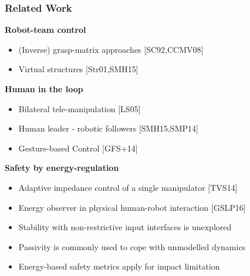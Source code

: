 \documentclass[student]{ITRslides}
\begin{document}
\begin{frame}
	\frametitle{Related Work}
	\textbf{Robot-team control}
	\begin{itemize}
		\item (Inverse) grasp-matrix approaches \nocite{Schneider_92,Caccavale_08} {\tiny [SC92,CCMV08]} 	
		\item Virtual structures \nocite{Stramigioli_01, Sieber_15} {\tiny [Str01,SMH15]} 
	\end{itemize}
	\textbf{Human in the loop}
	\begin{itemize}	
		\item Bilateral tele-manipulation  \nocite{Lee_05} {\tiny [LS05]} 	
		\item Human leader - robotic followers \nocite{Sieber_15, Scheggi_14}{\tiny [SMH15,SMP14]} 
		\item Gesture-based Control \nocite{Gioioso_2014}{\tiny [GFS+14]} 
	\end{itemize}
	\textbf{Safety by energy-regulation}
	\begin{itemize}
		\item Adaptive impedance control of a single manipulator \nocite{Tadele_14}{\tiny [TVS14]}
		\item Energy observer in physical human-robot interaction \nocite{Geravand_16}{\tiny [GSLP16]}
	\end{itemize}
		
			\begin{block}{}
			\begin{itemize}
			\item Stability with non-restrictive input interfaces is unexplored
			\item Passivity is commonly used to cope with unmodelled dynamics

			\item Energy-based safety metrics apply for impact limitation 
			\end{itemize}
			\end{block}
\end{frame}
\end{document}
